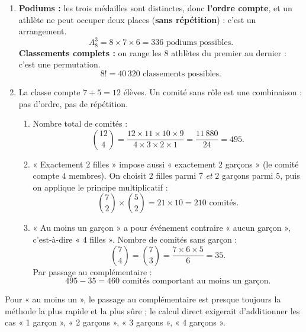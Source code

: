 \documentclass[11pt]{article}
\newcommand{\cle}[1]{{\popxbold\color{popdark}#1}}
\begin{document}
\begin{corrige}
\begin{enumerate}
\item \textbf{Podiums :} les trois médailles sont distinctes, donc \textbf{l'ordre compte}, et un athlète ne peut occuper deux places (\textbf{sans répétition}) : c'est un arrangement.
\[ A_8^3=8\times7\times6=336 \text{ podiums possibles.} \]
\textbf{Classements complets :} on range les $8$ athlètes du premier au dernier : c'est une permutation.
\[ 8!=40\,320 \text{ classements possibles.} \]
\item La classe compte $7+5=12$ élèves. Un comité sans rôle est une \cle{combinaison} : pas d'ordre, pas de répétition.
\begin{enumerate}
\item Nombre total de comités :
\[ \binom{12}{4}=\frac{12\times11\times10\times9}{4\times3\times2\times1}=\frac{11\,880}{24}=495. \]
\item « Exactement $2$ filles » impose aussi « exactement $2$ garçons » (le comité compte $4$ membres). On choisit $2$ filles parmi $7$ \emph{et} $2$ garçons parmi $5$, puis on applique le principe multiplicatif :
\[ \binom{7}{2}\times\binom{5}{2}=21\times10=210 \text{ comités.} \]
\item « Au moins un garçon » a pour événement contraire « aucun garçon », c'est-à-dire « $4$ filles ». Nombre de comités sans garçon :
\[ \binom{7}{4}=\binom{7}{3}=\frac{7\times6\times5}{6}=35. \]
Par passage au complémentaire :
\[ 495-35=460 \text{ comités comportant au moins un garçon.} \]
\end{enumerate}
\end{enumerate}
\end{corrige}

\begin{attention}
Pour « au moins un », le passage au complémentaire est presque toujours la méthode la plus rapide et la plus sûre ; le calcul direct exigerait d'additionner les cas « 1 garçon », « 2 garçons », « 3 garçons », « 4 garçons ».
\end{attention}
\end{document}
